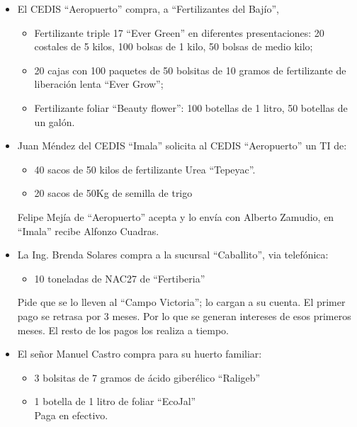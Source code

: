 \documentclass[
  letterpaper,
  DIV=11,
  numbers=noendperiod]{scrreprt}
\providecommand{\tightlist}{%
  \setlength{\itemsep}{0pt}\setlength{\parskip}{0pt}}\usepackage{longtable,booktabs,array}
\begin{document}
\begin{itemize}
\tightlist
\item
  El CEDIS ``Aeropuerto'' compra, a ``Fertilizantes del Bajío'',

  \begin{itemize}
  \tightlist
  \item
    Fertilizante triple 17 ``Ever Green'' en diferentes presentaciones:
    20 costales de 5 kilos, 100 bolsas de 1 kilo, 50 bolsas de medio
    kilo;
  \item
    20 cajas con 100 paquetes de 50 bolsitas de 10 gramos de
    fertilizante de liberación lenta ``Ever Grow'';
  \item
    Fertilizante foliar ``Beauty flower'': 100 botellas de 1 litro, 50
    botellas de un galón.
  \end{itemize}
\item
  Juan Méndez del CEDIS ``Imala'' solicita al CEDIS ``Aeropuerto'' un TI
  de:

  \begin{itemize}
  \tightlist
  \item
    40 sacos de 50 kilos de fertilizante Urea ``Tepeyac''.
  \item
    20 sacos de 50Kg de semilla de trigo
  \end{itemize}

  Felipe Mejía de ``Aeropuerto'' acepta y lo envía con Alberto Zamudio,
  en ``Imala'' recibe Alfonzo Cuadras.
\item
  La Ing. Brenda Solares compra a la sucursal ``Caballito'', via
  telefónica:

  \begin{itemize}
  \tightlist
  \item
    10 toneladas de NAC27 de ``Fertiberia''
  \end{itemize}

  Pide que se lo lleven al ``Campo Victoria''; lo cargan a su cuenta. El
  primer pago se retrasa por 3 meses. Por lo que se generan intereses de
  esos primeros meses. El resto de los pagos los realiza a tiempo.
\item
  El señor Manuel Castro compra para su huerto familiar:

  \begin{itemize}
  \tightlist
  \item
    3 bolsitas de 7 gramos de ácido giberélico ``Raligeb''\\
  \item
    1 botella de 1 litro de foliar ``EcoJal''\\
    Paga en efectivo.
  \end{itemize}
\end{itemize}
\end{document}
